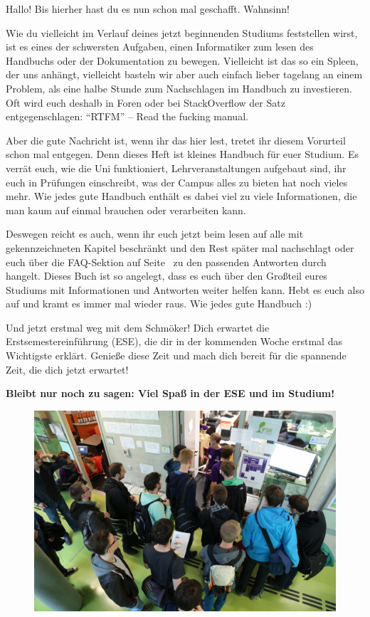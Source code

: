 

Hallo! Bis hierher hast du es nun schon mal geschafft. Wahnsinn!

Wie du vielleicht im Verlauf deines jetzt beginnenden Studiums feststellen wirst, ist es eines der schwersten Aufgaben, einen Informatiker zum lesen des Handbuchs oder der Dokumentation zu bewegen. Vielleicht ist das so ein Spleen, der uns anhängt, vielleicht basteln wir aber auch einfach lieber tagelang an einem Problem, als eine halbe Stunde zum Nachschlagen im Handbuch zu investieren.
Oft wird euch deshalb in Foren oder bei StackOverflow der Satz entgegenschlagen: \enquote{RTFM} -- Read the fucking manual.

Aber die gute Nachricht ist, wenn ihr das hier lest, tretet ihr diesem Vorurteil schon mal entgegen. Denn dieses Heft ist kleines Handbuch für euer Studium.
Es verrät euch, wie die Uni funktioniert, Lehrveranstaltungen aufgebaut sind, ihr euch in Prüfungen einschreibt, was der Campus alles zu bieten hat noch vieles mehr.
Wie jedes gute Handbuch enthält es dabei viel zu viele Informationen, die man kaum auf einmal brauchen oder verarbeiten kann.

Deswegen reicht es auch, wenn ihr euch jetzt beim lesen auf alle mit  gekennzeichneten Kapitel beschränkt und den Rest später mal nachschlagt oder euch über die FAQ-Sektion auf Seite~\pageref{sec:faq} zu den passenden Antworten durch hangelt.
Dieses Buch ist so angelegt, dass es euch über den Großteil eures Studiums mit Informationen und Antworten weiter helfen kann. Hebt es euch also auf und kramt es immer mal wieder raus. Wie jedes gute Handbuch :)

Und jetzt erstmal weg mit dem Schmöker! Dich erwartet die Erstsemestereinführung (ESE), die dir in der kommenden Woche erstmal das Wichtigste erklärt.
Genieße diese Zeit und mach dich bereit für die spannende Zeit, die dich jetzt erwartet!

\textbf{Bleibt nur noch zu sagen: Viel Spaß in der ESE und im Studium!}

\begin{figure}[b!]
	\centering
	\includegraphics[trim={0 5.5cm 0 0}, clip, width=\linewidth]{img/ese2015/bueroansturm.jpg}
\end{figure}%

